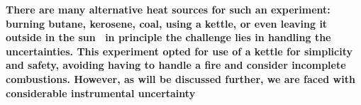 \textbf{There are many alternative heat sources for such an experiment: burning butane, kerosene, coal, using a kettle, or even leaving it outside in the sun \textendash\ in principle the challenge lies in handling the uncertainties. This experiment opted for use of a kettle for simplicity and safety, avoiding having to handle a fire and consider incomplete combustions. However, as will be discussed further, we are faced with considerable instrumental uncertainty }
